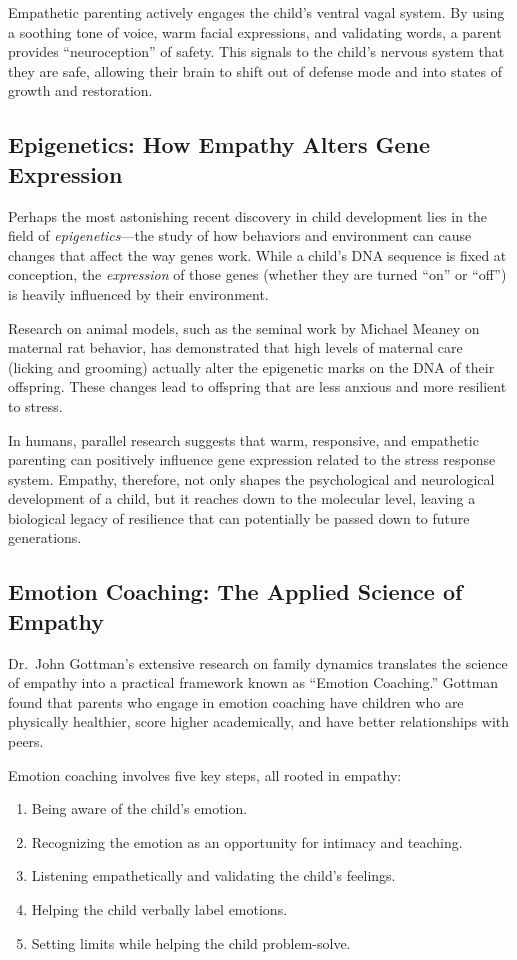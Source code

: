 Empathetic parenting actively engages the child's ventral vagal system. 
By using a soothing tone of voice, warm facial expressions, and validating words, a parent provides ``neuroception'' of safety. 
This signals to the child's nervous system that they are safe, allowing their brain to shift out of defense mode and into states of growth and restoration.

\subsection{Epigenetics: How Empathy Alters Gene Expression}

Perhaps the most astonishing recent discovery in child development lies in the field of \textit{epigenetics}---the study of how behaviors and environment can cause changes that affect the way genes work. 
While a child's DNA sequence is fixed at conception, the \textit{expression} of those genes (whether they are turned ``on'' or ``off'') is heavily influenced by their environment.

Research on animal models, such as the seminal work by Michael Meaney on maternal rat behavior, has demonstrated that high levels of maternal care (licking and grooming) actually alter the epigenetic marks on the DNA of their offspring. 
These changes lead to offspring that are less anxious and more resilient to stress.

In humans, parallel research suggests that warm, responsive, and empathetic parenting can positively influence gene expression related to the stress response system. 
Empathy, therefore, not only shapes the psychological and neurological development of a child, but it reaches down to the molecular level, leaving a biological legacy of resilience that can potentially be passed down to future generations.

\subsection{Emotion Coaching: The Applied Science of Empathy}

Dr.\ John Gottman's \citep{gottman1997} extensive research on family dynamics translates the science of empathy into a practical framework known as ``Emotion Coaching.'' 
Gottman found that parents who engage in emotion coaching have children who are physically healthier, score higher academically, and have better relationships with peers.

Emotion coaching involves five key steps, all rooted in empathy:
\begin{enumerate}
    \item Being aware of the child's emotion.
    \item Recognizing the emotion as an opportunity for intimacy and teaching.
    \item Listening empathetically and validating the child's feelings.
    \item Helping the child verbally label emotions.
    \item Setting limits while helping the child problem-solve.
\end{enumerate}

